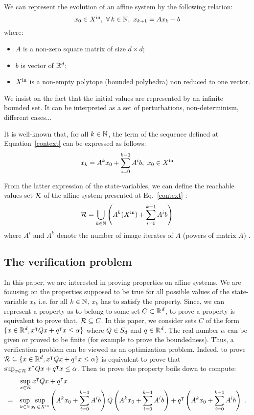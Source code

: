 \documentclass[10pt]{article}
\begin{document}
We can represent the evolution of an affine system by the following relation:
\begin{equation}
\label{context}
x_0\in X^\mathrm{in},\ \forall\, k\in\mathbb{N},\ x_{k+1}=A x_k + b  
\end{equation}
where:
\begin{itemize}
\item $A$ is a non-zero square matrix of size $d\times d$;
\item $b$ is vector of $\mathbb R^d$;
\item  $X^\mathrm{in}$ is a non-empty polytope (bounded polyhedra) non reduced to one vector. 
\end{itemize}
We insist on the fact that the initial values are represented by an infinite bounded set. It can be interpreted as a set of perturbations, non-determinism, different cases...

It is well-known that, for all $k\in\mathbb{N}$, the term of the sequence defined at Equation~\eqref{context} can be expressed as follows:
\[
x_k=A^k x_0+ \sum_{i=0}^{k-1} A^i b,\ x_0\in\xin
\]

From the latter expression of the state-variables, we can define the reachable values set $\mathcal{R}$ of the affine system presented at Eq.~\eqref{context} :
\begin{equation}
\label{reach}
\mathcal{R}=\bigcup_{k\in \mathbb{N}} \left(A^{k}(X^\mathrm{in})+\sum_{i=0}^{k-1} A^i b\right)
\end{equation}
where $A^i$ and $A^k$ denote the number of image iterates of $A$ (powers of matrix $A$) . 

\subsection{The verification problem}
In this paper, we are interested in proving properties on affine systems. We are focusing on the properties supposed to be true for all possible values of the state-variable $x_k$ i.e. for all $k\in\mathbb{N}$, $x_k$ has to satisfy the property. Since, we can represent a property as to belong to some set $C\subset \mathbb R^d$, to prove a property is equivalent to prove that, $\mathcal{R}\subseteq C$. In this paper, we consider sets $C$  of the form $\{x\in\mathbb R^d, x^\intercal Q x+q^\intercal x\leq \alpha\}$ where $Q\in S_d$ and $q\in\mathbb R^d$. The real number $\alpha$ can be given or proved to be finite (for example to prove the boundedness).  Thus, a verification problem can be viewed as an optimization problem. Indeed, to prove $\mathcal{R}\subseteq \{x\in\mathbb R^d, x^\intercal Q x+q^\intercal x\leq \alpha\}$ is equivalent to prove that
$\sup_{x\in\mathcal{R}} x^\intercal Q x+q^\intercal x\leq \alpha$.
Then to prove the property boils down to compute: 
\begin{equation}
\label{pbopt}
\begin{array}{ll}
&\displaystyle{\sup_{x\in\mathcal{R}} x^\intercal Q x+q^\intercal x}\\
=&\displaystyle{\sup_{k\in\mathbb{N}}\sup_{x_0\in X^\mathrm{in}}  \left(A^k x_0+ \sum_{i=0}^{k-1} A^i b \right) Q \left( A^k x_0+ \sum_{i=0}^{k-1} A^i b\right) +q^\intercal \left(A^k x_0+ \sum_{i=0}^{k-1} A^i b\right)}\enspace .
\end{array}
\end{equation} 
\end{document}
